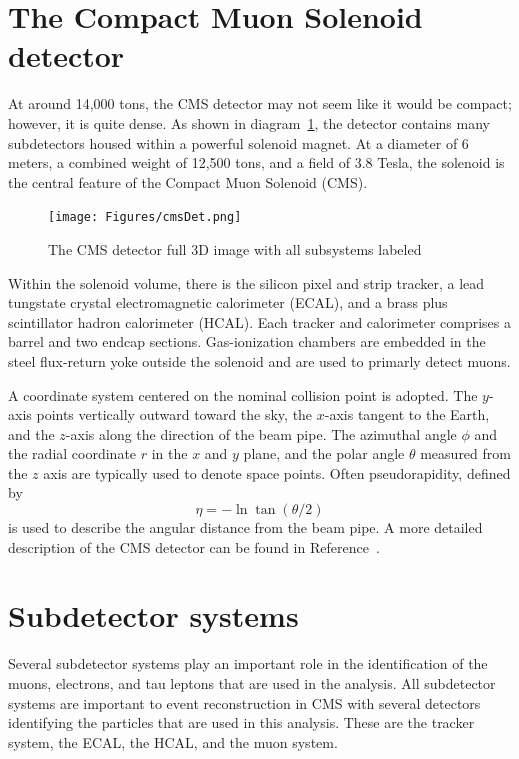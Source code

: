 \section{The Compact Muon Solenoid detector}
At around 14,000 tons, the CMS detector may not seem like it would be compact; however, it is quite dense. 
As shown in diagram~\ref{fig:cmsdet}, the detector contains many subdetectors housed within a powerful solenoid magnet. At a diameter of 6 meters, a combined weight of 12,500 tons, and a field of 3.8 Tesla, the solenoid is the central feature of the Compact Muon Solenoid (CMS).
\begin{figure}[!htb]
\begin{center}
\texttt{[image: Figures/cmsDet.png]}
\caption{\label{fig:cmsdet}The CMS detector full 3D image with all subsystems labeled}
\end{center}
\end{figure}
 Within the solenoid volume, there is the
silicon pixel and strip tracker, a lead tungstate crystal 
electromagnetic calorimeter (ECAL), and a brass plus scintillator 
hadron calorimeter (HCAL). Each tracker and calorimeter comprises a barrel and two endcap 
sections. 
Gas-ionization chambers are embedded 
in the steel flux-return yoke outside the solenoid and are used to primarly detect muons.

A coordinate system centered on the nominal collision point is adopted. 
The $y$-axis points vertically outward toward the sky, the $x$-axis tangent to the Earth, and the $z$-axis along the direction of the beam pipe. The azimuthal angle $\phi$ and the radial coordinate $r$ in the $x$ and $y$ plane, and the polar angle $\theta$ measured from the $z$ axis are typically used to denote space points. 
Often pseudorapidity, defined by
\begin{equation}\eta = - \ln \tan(\theta/2)\end{equation}  
 is used to describe the angular distance from the beam pipe. A more detailed description of the CMS detector can be found in Reference~\cite{Chatrchyan:2008zzk}.



\section{Subdetector systems}
Several subdetector systems play an important role in the identification of the muons, electrons, and tau leptons that are used in the analysis. 
All subdetector systems are important to event reconstruction in CMS with several detectors identifying the particles that are used in this analysis. These are the tracker system, the ECAL, the HCAL, and the muon system. 

